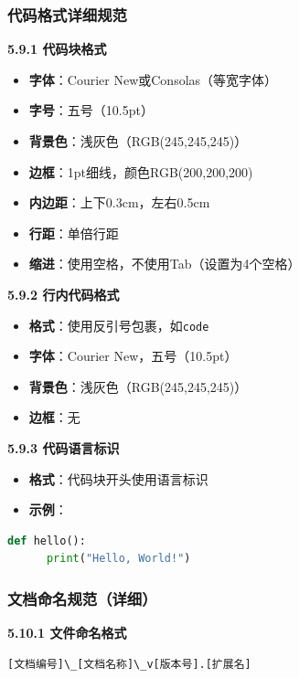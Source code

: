 \documentclass[12pt,a4paper]{article}
\numberwithin{equation}{section}  %
\begin{document}
\subsubsection{代码格式详细规范}
\textbf{5.9.1 代码块格式}

\begin{itemize}
\item \textbf{字体}：Courier New或Consolas（等宽字体）
\item \textbf{字号}：五号（10.5pt）
\item \textbf{背景色}：浅灰色（RGB(245,245,245)）
\item \textbf{边框}：1pt细线，颜色RGB(200,200,200)
\item \textbf{内边距}：上下0.3cm，左右0.5cm
\item \textbf{行距}：单倍行距
\item \textbf{缩进}：使用空格，不使用Tab（设置为4个空格）
\end{itemize}

\textbf{5.9.2 行内代码格式}

\begin{itemize}
\item \textbf{格式}：使用反引号包裹，如\texttt{code}
\item \textbf{字体}：Courier New，五号（10.5pt）
\item \textbf{背景色}：浅灰色（RGB(245,245,245)）
\item \textbf{边框}：无
\end{itemize}

\textbf{5.9.3 代码语言标识}

\begin{itemize}
\item \textbf{格式}：代码块开头使用语言标识
\item \textbf{示例}：
\end{itemize}
  \begin{lstlisting}[language=python]
  def hello():
      print("Hello, World!")
  \end{lstlisting}

\subsubsection{文档命名规范（详细）}
\textbf{5.10.1 文件命名格式}

\begin{verbatim}
[文档编号]\_[文档名称]\_v[版本号].[扩展名]
\end{verbatim}
\end{document}
